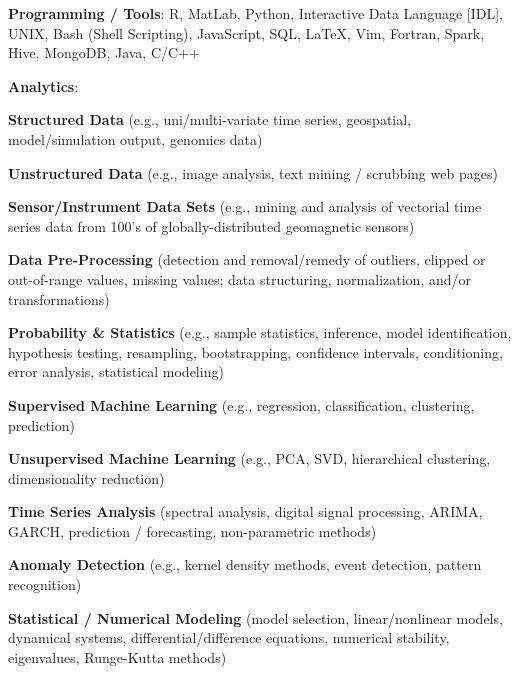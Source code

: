 \vspace{0.3cm}
\noindent\textbf{Programming / Tools}: R, MatLab, Python, Interactive
  Data Language [IDL], UNIX, Bash (Shell Scripting),   
  JavaScript, SQL, LaTeX, Vim, Fortran, Spark, Hive, MongoDB, Java, C/C++
  \vspace{0.1in}

\noindent\textbf{Analytics}:
\vspace{-0.2cm}
\begin{itemize*}
  \item \textbf{Structured Data} (e.g., uni/multi-variate time series,
    geospatial, model/simulation output, genomics data)
  \item \textbf{Unstructured Data} (e.g., image analysis, text mining / scrubbing
    web pages)
  \item \textbf{Sensor/Instrument Data Sets} 
    (e.g., mining and analysis of vectorial time series data
    from 100's of globally-distributed geomagnetic sensors)
  \item \textbf{Data Pre-Processing} (detection and
    removal/remedy of outliers, clipped or out-of-range values, missing
    values; data structuring, normalization, and/or transformations)
  \item \textbf{Probability \& Statistics} (e.g., sample statistics, inference, model
    identification, hypothesis testing, resampling, bootstrapping, confidence
    intervals, conditioning, error analysis, statistical modeling)
  \item \textbf{Supervised Machine Learning} (e.g., regression, classification, clustering,
    prediction)
  \item \textbf{Unsupervised Machine Learning} (e.g., PCA, SVD,
    hierarchical clustering, dimensionality reduction)
  \item \textbf{Time Series Analysis} (spectral
    analysis, digital signal processing, ARIMA, GARCH, prediction / forecasting,
    non-parametric methods)
  \item \textbf{Anomaly Detection} (e.g., kernel density methods,	
    event detection, pattern recognition)
  \item \textbf{Statistical / Numerical Modeling}
    (model selection, linear/nonlinear models, dynamical systems,
    differential/difference equations, numerical stability, eigenvalues,
    Runge-Kutta methods)
\end{itemize*}

